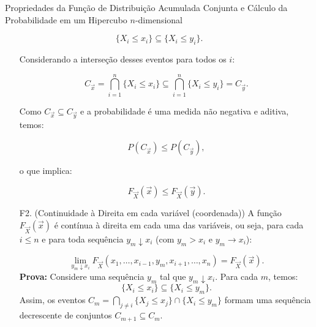 \begin{frame}
\begin{block}{ Propriedades da Função de Distribuição Acumulada Conjunta e Cálculo da Probabilidade em um Hipercubo $n$-dimensional}
\begin{enumerate}
\[
\{ X_i \leq x_i \} \subseteq \{ X_i \leq y_i \}.
\]


% 
%

\end{enumerate}
\end{block}
\end{frame}

\begin{frame}
	\begin{block}{}
\begin{enumerate}		
	
\item[]	Considerando a interseção desses eventos para todos os \( i \):
	
	\[
	C_{\vec{x}} = \bigcap_{i=1}^{n} \{ X_i \leq x_i \} \subseteq \bigcap_{i=1}^{n} \{ X_i \leq y_i \} = C_{\vec{y}}.
	\]
	
	Como \( C_{\vec{x}} \subseteq C_{\vec{y}} \) e a probabilidade é uma medida não negativa e aditiva, temos:
	
	\[
	P(C_{\vec{x}}) \leq P(C_{\vec{y}}),
	\]
	
	o que implica:
	
	\[
	F_{\vec{X}}(\vec{x}) \leq F_{\vec{X}}(\vec{y}).
	\]
	\item[F2.](Continuidade à Direita em cada variável (coordenada)) A função \( F_{\vec{X}}(\vec{x}) \) é contínua à direita em cada uma das variáveis, ou seja, para cada \( i \leq n \) e para toda sequência \( y_m \downarrow x_i \) (com \( y_m > x_i \) e \( y_m \to x_i \)):
	
	\[
	\lim_{y_m \downarrow x_i} F_{\vec{X}}(x_1, \dots, x_{i-1}, y_m, x_{i+1}, \dots, x_n) = F_{\vec{X}}(\vec{x}).
	\]
	\medskip
	{\bf Prova:} Considere uma sequência \( y_m \) tal que \( y_m \downarrow x_i \). Para cada \( m \), temos:
	\[
	\{ X_i \leq x_i \} \subseteq \{ X_i \leq y_m \}.
	\]
	Assim, os eventos \( C_m = \bigcap_{j \neq i} \{ X_j \leq x_j \} \cap \{ X_i \leq y_m \} \) formam uma sequência decrescente de conjuntos $
	C_{m+1} \subseteq C_m.
$	
	\end{enumerate}
	\end{block}
	
\end{frame}	

